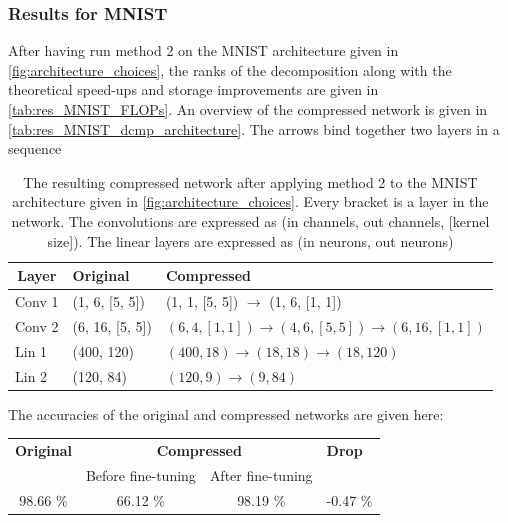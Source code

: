 \subsubsection{Results for MNIST}
After having run method 2 on the MNIST architecture given in \autoref{fig:architecture_choices}, the ranks of the decomposition along with the theoretical speed-ups and storage improvements are given in \autoref{tab:res_MNIST_FLOPs}. An overview of the compressed network is given in \autoref{tab:res_MNIST_dcmp_architecture}. The arrows bind together two layers in a sequence
\begin{table}
\centering
\captionsetup{width=.95\linewidth}
\caption{The resulting compressed network after applying method 2 to the MNIST architecture given in \autoref{fig:architecture_choices}. Every bracket is a layer in the network. The convolutions are expressed as (in channels, out channels, [kernel size]). The linear layers are expressed as (in neurons, out neurons)}
\label{tab:res_MNIST_dcmp_architecture}
\begin{tabular}{cll}
\textbf{Layer}            & \textbf{Original}              & \textbf{Compressed}                                                          \\ \hline
Conv 1                    & (1, 6, [5, 5])                 & (1, 1, [5, 5]) $\rightarrow$ (1, 6, [1, 1])                                  \\
Conv 2                    & (6, 16, [5, 5])                & $ (6, 4, [1, 1]) \rightarrow (4, 6, [5, 5]) \rightarrow (6, 16, [1, 1]) $    \\ \hline
\multicolumn{1}{l}{Lin 1} & \multicolumn{1}{l}{(400, 120)} & \multicolumn{1}{l}{$ (400, 18) \rightarrow (18, 18) \rightarrow (18, 120) $} \\
\multicolumn{1}{l}{Lin 2} & \multicolumn{1}{l}{(120, 84)}  & \multicolumn{1}{l}{$ (120, 9) \rightarrow (9, 84) $}                        
\end{tabular}
\end{table}
The accuracies of the original and compressed networks are given here:
\begin{table}[H]
\centering
\begin{tabular}{cccl}
\textbf{Original} & \multicolumn{2}{c}{\textbf{Compressed}} & \textbf{Drop} \\
                  & Before fine-tuning  & After fine-tuning &               \\
98.66 \%          & 66.12 \%            & 98.19 \%          & -0.47 \%        
\end{tabular}
\end{table}
